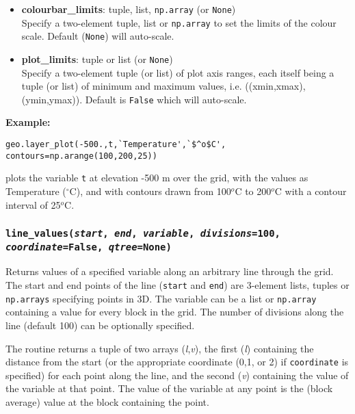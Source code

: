 \begin{itemize}
\item \textbf{colourbar\_limits}: tuple, list, \texttt{np.array} (or \texttt{None})\\
  Specify a two-element tuple, list or \texttt{np.array} to set the limits of the colour scale.  Default (\texttt{None}) will auto-scale.
\item \textbf{plot\_limits}: tuple or list (or \texttt{None})\\
  Specify a two-element tuple (or list) of plot axis ranges, each itself being a tuple (or list) of minimum and maximum values, i.e. ((xmin,xmax),(ymin,ymax)).  Default is \texttt{False} which will auto-scale.
\end{itemize}

\textbf{Example:}

\begin{verbatim}
geo.layer_plot(-500.,t,`Temperature',`$^o$C', contours=np.arange(100,200,25))
\end{verbatim}

plots the variable \texttt{t} at elevation -500 m over the grid, with the values as Temperature ($^{\circ}$C), and with contours drawn from 100$^o$C to 200$^o$C with a contour interval of 25$^o$C.

\subsubsection{\texttt{line\_values(\emph{start}, \emph{end}, \emph{variable}, \emph{divisions}=100, \emph{coordinate}=\texttt{False}, \emph{qtree}=None)}}

Returns values of a specified variable along an arbitrary line through the grid.  The start and end points of the line (\texttt{start} and \texttt{end}) are 3-element lists, tuples or \texttt{np.arrays} specifying points in 3D.  The variable can be a list or \texttt{np.array} containing a value for every block in the grid.  The number of divisions along the line (default 100) can be optionally specified.

The routine returns a tuple of two arrays (\emph{l},\emph{v}), the first (\emph{l}) containing the distance from the start (or the appropriate coordinate (0,1, or 2) if \texttt{coordinate} is specified) for each point along the line, and the second (\emph{v}) containing the value of the variable at that point.  The value of the variable at any point is the (block average) value at the block containing the point.

